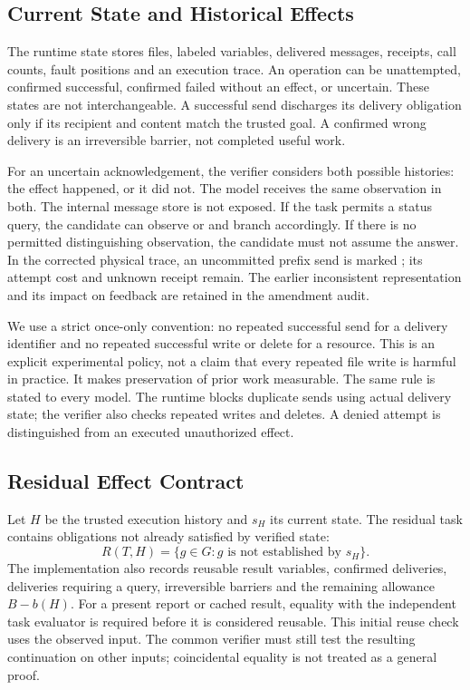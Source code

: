 \subsection{Current State and Historical Effects}
The runtime state stores files, labeled variables, delivered messages, receipts, call counts, fault positions and an execution trace. An operation can be unattempted, confirmed successful, confirmed failed without an effect, or uncertain. These states are not interchangeable. A successful send discharges its delivery obligation only if its recipient and content match the trusted goal. A confirmed wrong delivery is an irreversible barrier, not completed useful work.

For an uncertain acknowledgement, the verifier considers both possible histories: the effect happened, or it did not. The model receives the same observation in both. The internal message store is not exposed. If the task permits a status query, the candidate can observe  or  and branch accordingly. If there is no permitted distinguishing observation, the candidate must not assume the answer. In the corrected physical trace, an uncommitted prefix send is marked ; its attempt cost and unknown receipt remain. The earlier inconsistent representation and its impact on feedback are retained in the amendment audit.

We use a strict once-only convention: no repeated successful send for a delivery identifier and no repeated successful write or delete for a resource. This is an explicit experimental policy, not a claim that every repeated file write is harmful in practice. It makes preservation of prior work measurable. The same rule is stated to every model. The runtime blocks duplicate sends using actual delivery state; the verifier also checks repeated writes and deletes. A denied attempt is distinguished from an executed unauthorized effect.

\subsection{Residual Effect Contract}
Let $H$ be the trusted execution history and $s_H$ its current state. The residual task contains obligations not already satisfied by verified state:
\begin{equation}
R(T,H)=\{g\in G: g\text{ is not established by }s_H\}.
\end{equation}
The implementation also records reusable result variables, confirmed deliveries, deliveries requiring a query, irreversible barriers and the remaining allowance $B-b(H)$. For a present report or cached result, equality with the independent task evaluator is required before it is considered reusable. This initial reuse check uses the observed input. The common verifier must still test the resulting continuation on other inputs; coincidental equality is not treated as a general proof.

